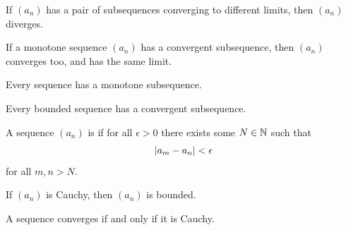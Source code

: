 \documentclass[11pt,twoside=off,numbers=noenddot]{scrbook}
\begin{document}
\begin{corollary}
    If $(a_n)$ has a pair of subsequences converging to different limits, then $(a_n)$ diverges.
\end{corollary}

\begin{proposition}
    If a monotone sequence $(a_n)$ has a convergent subsequence, then $(a_n)$ converges too, and has the same limit.
\end{proposition}

\begin{lemma}
    Every sequence has a monotone subsequence.
\end{lemma}

\begin{theorem}
    Every bounded sequence has a convergent subsequence.
\end{theorem}

\begin{definition}
    A sequence $(a_n)$ is  if for all $\epsilon > 0$ there exists some $N \in \mathbb N$ such that
    \[ | a_m - a_n | < \epsilon \]
    for all $m, n > N$.
\end{definition}

\begin{lemma}
    If $(a_n)$ is Cauchy, then $(a_n)$ is bounded.
\end{lemma}

\begin{theorem}
    A sequence converges if and only if it is Cauchy.
\end{theorem}








\printbibliography[nottype=image]
\end{document}

